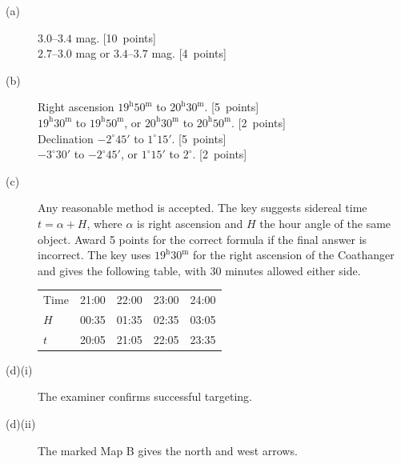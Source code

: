 \begin{description}
\item[(a)] \(3.0\)--\(3.4\) mag. \hfill\mbox{[10 points]}\\
\(2.7\)--\(3.0\) mag or \(3.4\)--\(3.7\) mag. \hfill\mbox{[4 points]}

\item[(b)] Right ascension \(19^{\mathrm h}50^{\mathrm m}\) to
\(20^{\mathrm h}30^{\mathrm m}\). \hfill\mbox{[5 points]}\\
\(19^{\mathrm h}30^{\mathrm m}\) to \(19^{\mathrm h}50^{\mathrm m}\), or
\(20^{\mathrm h}30^{\mathrm m}\) to \(20^{\mathrm h}50^{\mathrm m}\).
\hfill\mbox{[2 points]}\\
Declination \(-2^\circ45'\) to \(1^\circ15'\). \hfill\mbox{[5 points]}\\
\(-3^\circ30'\) to \(-2^\circ45'\), or \(1^\circ15'\) to \(2^\circ\).
\hfill\mbox{[2 points]}

\item[(c)] Any reasonable method is accepted. The key suggests sidereal time
\(t=\alpha+H\), where \(\alpha\) is right ascension and \(H\) the hour angle of
the same object. Award 5 points for the correct formula if the final answer
is incorrect. The key uses \(19^{\mathrm h}30^{\mathrm m}\) for the right
ascension of the Coathanger and gives the following table, with 30 minutes
allowed either side.

\begin{center}
\begin{tabular}{@{}lrrrr@{}}
\toprule
Time & 21:00 & 22:00 & 23:00 & 24:00\\
\(H\) & 00:35 & 01:35 & 02:35 & 03:05\\
\(t\) & 20:05 & 21:05 & 22:05 & 23:35\\
\bottomrule
\end{tabular}
\end{center}

\item[(d)(i)] The examiner confirms successful targeting.
\item[(d)(ii)] The marked Map B gives the north and west arrows.
\end{description}
